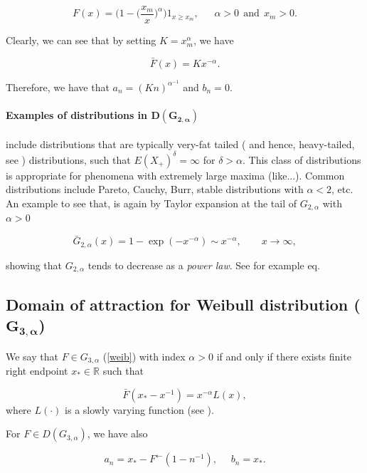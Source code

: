 \documentclass[11pt,a4paper,openany ]{book}
\begin{document}
\begin{equation*}
F(x)=\bigg(1-\big(\frac{x_m}{x}\big)^{\alpha}\bigg)1_{x\geq x_m}, \ \ \ \ \ \ \ \alpha>0 \  \ \text{and} \ \ x_m>0.
\end{equation*}

Clearly, we can see that by setting $K=x_m^{\alpha}$, we have

\begin{equation*}
\bar{F}(x)=Kx^{-\alpha}.
\end{equation*}

Therefore, we have that $a_n=(Kn)^{\alpha^{-1}}$ and $b_n=0$.

\paragraph*{Examples of distributions in $\boldsymbol{D(G_{2,\alpha})}$} include distributions that are typically very-fat tailed ( and hence, heavy-tailed, see ) distributions, such that $E(X_+)^{\delta}=\infty$ for $\delta>\alpha$. This class of distributions is appropriate for phenomena with extremely large maxima (like...). \cite{domain of attraction course} Common distributions include Pareto, Cauchy, Burr, stable distributions with $\alpha<2$, etc.
An example to see that, is again by Taylor expansion at the tail of $G_{2,\alpha}$ with $\alpha>0$ 

\begin{equation}
\bar{G}_{2,\alpha}(x)=1-\exp(-x^{-\alpha})\sim x^{-\alpha}, \ \ \ \ \ \ \ \ \ x\to\infty,
\end{equation}

showing that $G_{2,\alpha}$ tends to decrease as a \emph{power law}.
See for example eq.

\subsection*{Domain of attraction for Weibull distribution ($\mathbf{G_{3,\alpha}}$) }
We say  that $F\in G_{3,\alpha}$ (\ref{weib}) with index $\alpha>0$ if and only if there exists finite right endpoint $x_*\in\mathbb{R}$ such that 

\begin{equation}
\bar{F}(x_*-x^{-1})=x^{-\alpha}L(x),
\end{equation}
where $L(\cdot)$ is a slowly varying function (see ).

For $F\in D(G_{3,\alpha})$, we have also

\begin{equation*}
a_n=x_*-F^{\leftarrow}(1-n^{-1}), \ \  \ \ \ \ b_n=x_*.
\end{equation*}
\end{document}
